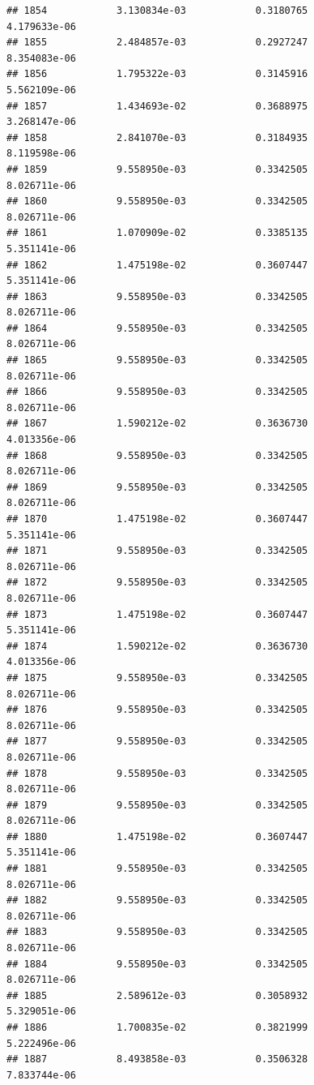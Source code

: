 \documentclass[
]{article}
\begin{document}
\begin{verbatim}
## 1854            3.130834e-03            0.3180765            4.179633e-06
## 1855            2.484857e-03            0.2927247            8.354083e-06
## 1856            1.795322e-03            0.3145916            5.562109e-06
## 1857            1.434693e-02            0.3688975            3.268147e-06
## 1858            2.841070e-03            0.3184935            8.119598e-06
## 1859            9.558950e-03            0.3342505            8.026711e-06
## 1860            9.558950e-03            0.3342505            8.026711e-06
## 1861            1.070909e-02            0.3385135            5.351141e-06
## 1862            1.475198e-02            0.3607447            5.351141e-06
## 1863            9.558950e-03            0.3342505            8.026711e-06
## 1864            9.558950e-03            0.3342505            8.026711e-06
## 1865            9.558950e-03            0.3342505            8.026711e-06
## 1866            9.558950e-03            0.3342505            8.026711e-06
## 1867            1.590212e-02            0.3636730            4.013356e-06
## 1868            9.558950e-03            0.3342505            8.026711e-06
## 1869            9.558950e-03            0.3342505            8.026711e-06
## 1870            1.475198e-02            0.3607447            5.351141e-06
## 1871            9.558950e-03            0.3342505            8.026711e-06
## 1872            9.558950e-03            0.3342505            8.026711e-06
## 1873            1.475198e-02            0.3607447            5.351141e-06
## 1874            1.590212e-02            0.3636730            4.013356e-06
## 1875            9.558950e-03            0.3342505            8.026711e-06
## 1876            9.558950e-03            0.3342505            8.026711e-06
## 1877            9.558950e-03            0.3342505            8.026711e-06
## 1878            9.558950e-03            0.3342505            8.026711e-06
## 1879            9.558950e-03            0.3342505            8.026711e-06
## 1880            1.475198e-02            0.3607447            5.351141e-06
## 1881            9.558950e-03            0.3342505            8.026711e-06
## 1882            9.558950e-03            0.3342505            8.026711e-06
## 1883            9.558950e-03            0.3342505            8.026711e-06
## 1884            9.558950e-03            0.3342505            8.026711e-06
## 1885            2.589612e-03            0.3058932            5.329051e-06
## 1886            1.700835e-02            0.3821999            5.222496e-06
## 1887            8.493858e-03            0.3506328            7.833744e-06

\end{verbatim}
\end{document}
